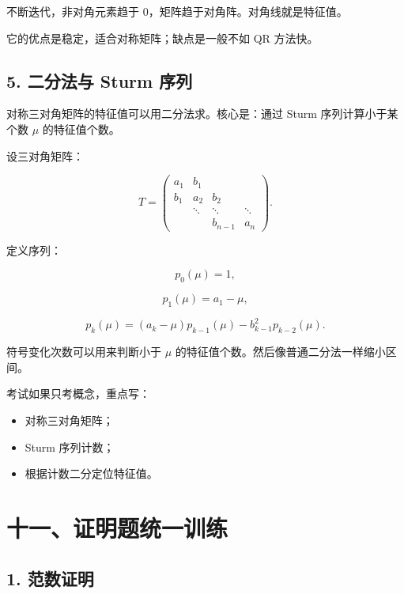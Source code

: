 \documentclass[11pt,a4paper]{ctexart}
\begin{document}
不断迭代，非对角元素趋于 0，矩阵趋于对角阵。对角线就是特征值。

它的优点是稳定，适合对称矩阵；缺点是一般不如 QR 方法快。


\subsection*{5. 二分法与 Sturm 序列}


对称三对角矩阵的特征值可以用二分法求。核心是：通过 Sturm 序列计算小于某个数 $\mu$ 的特征值个数。

设三对角矩阵：

\[
T=
\begin{pmatrix}
a_1&b_1&&\\
b_1&a_2&b_2&\\
&\ddots&\ddots&\ddots\\
&&b_{n-1}&a_n
\end{pmatrix}.
\]

定义序列：

\[
p_0(\mu)=1,
\]

\[
p_1(\mu)=a_1-\mu,
\]

\[
p_k(\mu)=(a_k-\mu)p_{k-1}(\mu)-b_{k-1}^2p_{k-2}(\mu).
\]

符号变化次数可以用来判断小于 $\mu$ 的特征值个数。然后像普通二分法一样缩小区间。

考试如果只考概念，重点写：

\begin{itemize}

\item 对称三对角矩阵；

\item Sturm 序列计数；

\item 根据计数二分定位特征值。

\end{itemize}


\section*{十一、证明题统一训练}



\subsection*{1. 范数证明}
\end{document}
